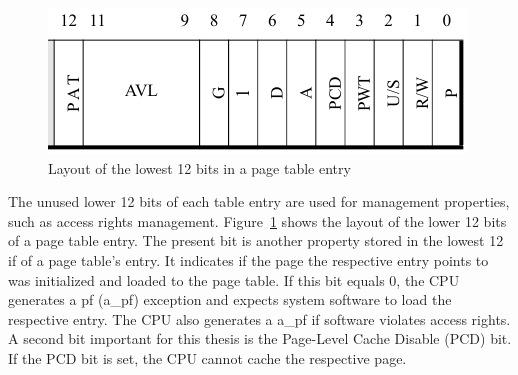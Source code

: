 \begin{figure}
    \begin{center}
        \includegraphics[width=.6\textwidth]{images/paging_rights_placeholder.png}
        \caption{Layout of the lowest 12 bits in a page table entry}
        \label{fig:state:technical:paging_rights}
    \end{center}
\end{figure}

The unused lower 12 bits of each table entry are used for management properties,
such as access rights management. Figure~\ref{fig:state:technical:paging_rights}
shows the layout of the lower 12 bits of a page table entry. The present bit is
another property stored in the lowest 12 if of a page table's entry. It
indicates if the page the respective entry points to was initialized and loaded
to the page table. If this bit equals 0, the CPU generates a \gls{pf}
(\acrshort{a_pf}) exception and expects system software to load the respective
entry. The CPU also generates a \acrshort{a_pf} if software violates access
rights. A second bit important for this thesis is the Page-Level Cache Disable
(PCD) bit. If the PCD bit is set, the CPU cannot cache the respective page.

